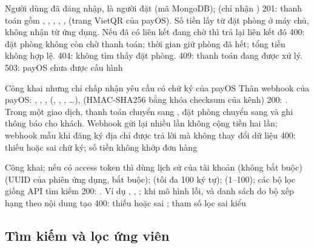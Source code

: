 {}
{Người dùng đã đăng nhập, là người đặt}
{}
{ (mã MongoDB);  (chỉ nhận )}
{201: thanh toán gồm , , , , ,  (trang VietQR của payOS). Số tiền lấy từ đặt phòng ở máy chủ, không nhận từ ứng dụng. Nếu đã có liên kết đang chờ thì trả lại liên kết đó}
{400: đặt phòng không còn chờ thanh toán; thời gian giữ phòng đã hết; tổng tiền không hợp lệ. 404: không tìm thấy đặt phòng. 409: thanh toán đang được xử lý. 503: payOS chưa được cấu hình}

{}
{Công khai nhưng chỉ chấp nhận yêu cầu có chữ ký của payOS}
{}
{Thân webhook của payOS: , , ,  (, , , \ldots),  (HMAC-SHA256 bằng khóa checksum của kênh)}
{200: . Trong một giao dịch, thanh toán chuyển sang , đặt phòng chuyển sang  và ghi thông báo cho khách. Webhook gửi lại nhiều lần không cộng tiền hai lần; webhook mẫu khi đăng ký địa chỉ được trả lời mà không thay đổi dữ liệu}
{400: thiếu hoặc sai chữ ký; số tiền không khớp đơn hàng}

{}
{Công khai; nếu có access token thì dùng lịch sử của tài khoản}
{ (không bắt buộc)}
{ (UUID của phiên ứng dụng, bắt buộc);  (tối đa 100 ký tự);  (1--100); các bộ lọc giống API tìm kiếm}
{200: . Ví dụ , , ; khi mô hình lỗi,  và danh sách do bộ xếp hạng theo nội dung tạo}
{400: thiếu hoặc sai ; tham số lọc sai kiểu}

\subsection{Tìm kiếm và lọc ứng viên}\label{sec:search-design}

